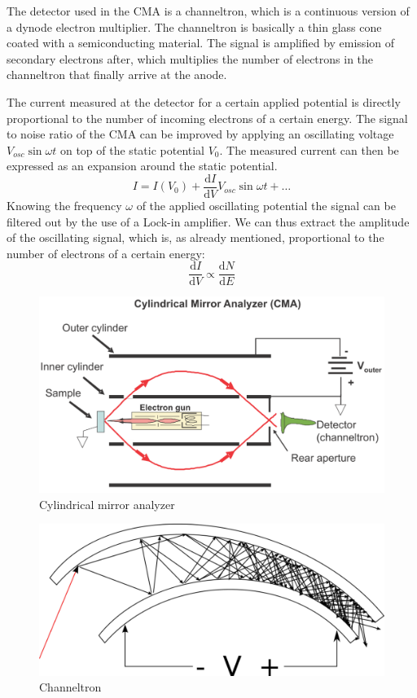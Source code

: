 \documentclass[a4paper,10pt]{scrartcl}
\begin{document}
The detector used in the CMA is a channeltron, which is a continuous version of a dynode electron multiplier. The channeltron is basically a thin glass cone coated with a semiconducting material. The signal is amplified by emission of secondary electrons after, which multiplies the number of electrons in the channeltron that finally arrive at the anode.

The current measured at the detector for a certain applied potential is directly proportional to the number of incoming electrons of a certain energy. The signal to noise ratio of the CMA can be improved by applying an oscillating voltage $V_{osc} \sin \omega t$ on top of the static potential $V_{0}$. The measured current can then be expressed as an expansion around the static potential.
\begin{equation}
I = I(V_{0}) + \frac{\mbox{d} I}{\mbox{d} V} V_{osc} \sin \omega t + \ldots
\end{equation}
Knowing the frequency $\omega$ of the applied oscillating potential the signal can be filtered out by the use of a Lock-in amplifier. We can thus extract the amplitude of the oscillating signal, which is, as already mentioned, proportional to the number of electrons of a certain energy:
\begin{equation}
\frac{\mbox{d} I}{\mbox{d} V} \propto \frac{\mbox{d} N}{\mbox{d} E}
\end{equation}

\begin{figure}
\centering
\includegraphics[scale=0.35]{img/cma}
\caption{Cylindrical mirror analyzer \label{fig:cma}}
\end{figure}

\begin{figure}
\centering
\includegraphics[scale=0.25]{img/channeltron}
\caption{Channeltron \label{fig:ct}}
\end{figure}
\end{document}
